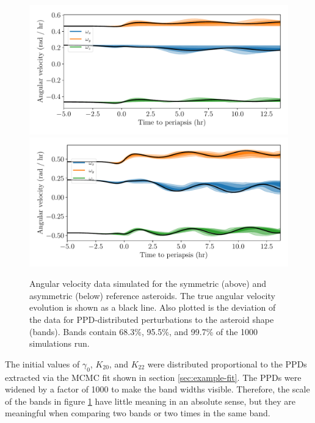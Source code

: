 \documentclass[fleqn,usenatbib]{mnras}
\begin{document}
\begin{figure}
  \centering
  \includegraphics[width=\linewidth]{figs/nominal-data-sym.pdf}
  \includegraphics[width=\linewidth]{figs/nominal-data-asym.pdf}
  \caption{Angular velocity data simulated for the symmetric (above) and asymmetric (below) reference asteroids. The true angular velocity evolution is shown as a black line. Also plotted is the deviation of the data for PPD-distributed perturbations to the asteroid shape (bands). Bands contain 68.3\%, 95.5\%, and 99.7\% of the 1000 simulations run.}
  \label{fig:example-data}
\end{figure}

The initial values of $\gamma_0$, $K_{20}$, and $K_{22}$ were distributed proportional to the PPDs extracted via the MCMC fit shown in section \ref{sec:example-fit}. The PPDs were widened by a factor of 1000 to make the band widths visible. Therefore, the scale of the bands in figure \ref{fig:example-data} have little meaning in an absolute sense, but they are meaningful when comparing two bands or two times in the same band.
\end{document}
